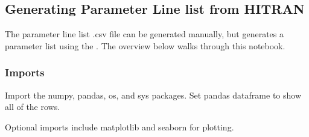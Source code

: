 \documentclass[letterpaper,10pt,english]{sphinxmanual}
\begin{document}
\subsection{Generating Parameter Line list from HITRAN}
\label{\detokenize{Generating Parameter Line lists:generating-parameter-line-list-from-hitran}}
\sphinxAtStartPar
The parameter line list .csv file can be generated manually, but  generates a parameter list using the .  The overview below walks through this notebook.


\subsubsection{Imports}
\label{\detokenize{Generating Parameter Line lists:imports}}
\sphinxAtStartPar
Import the numpy, pandas, os, and sys packages.  Set pandas dataframe to show all of the rows.

\begin{sphinxVerbatim}[commandchars=\\\{\}]
   
   
 
  
\end{sphinxVerbatim}

\sphinxAtStartPar
Optional imports include matplotlib and seaborn for plotting.

\begin{sphinxVerbatim}[commandchars=\\\{\}]
   
   
\end{sphinxVerbatim}
\end{document}
